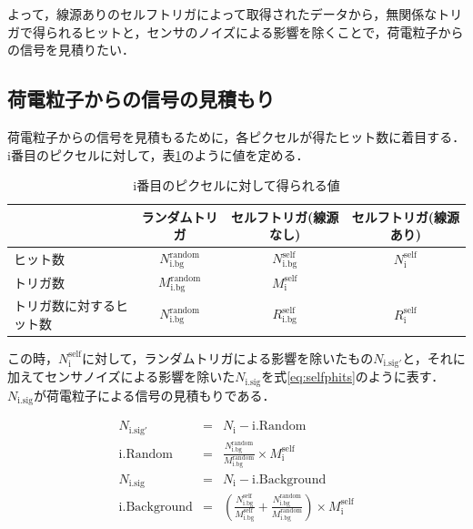 よって，線源ありのセルフトリガによって取得されたデータから，無関係なトリガで得られるヒットと，センサのノイズによる影響を除くことで，荷電粒子からの信号を見積りたい．

\subsection*{荷電粒子からの信号の見積もり}
荷電粒子からの信号を見積もるために，各ピクセルが得たヒット数に着目する．i番目のピクセルに対して，表\ref{tab:selfpara}のように値を定める．
  \begin{table}[h]
    \centering
    \caption{i番目のピクセルに対して得られる値}
    \begin{tabular} {l|ccc} \hline
      & ランダムトリガ & セルフトリガ(線源なし) & セルフトリガ(線源あり) \\ \hline
      ヒット数 & $N_{\mathrm{i.bg}}^{\mathrm{random}}$& $N_{\mathrm{i.bg}}^{\mathrm{self}}$ & $N_{\mathrm{i}}^{\mathrm{self}}$ \\
      トリガ数 & $M_{\mathrm{i.bg}}^{\mathrm{random}}$ & $M_{\mathrm{i}}^{\mathrm{self}}$ \\
      トリガ数に対するヒット数 & $N_{\mathrm{i.bg}}^{\mathrm{random}}$ & $R_{\mathrm{i.bg}}^{\mathrm{self}}$ & $R_{\mathrm{i}}^{\mathrm{self}}$ \\\hline
    \end{tabular}
    \label{tab:selfpara}
  \end{table}


この時，$N_{\mathrm{i}}^{\mathrm{self}}$に対して，ランダムトリガによる影響を除いたもの$N_{\mathrm{i.sig'}}$と，それに加えてセンサノイズによる影響を除いた$N_{\mathrm{i.sig}}$を式\ref{eq:selfphits}のように表す．$N_{\mathrm{i.sig}}$が荷電粒子による信号の見積もりである．
  
\begin{eqnarray}
  \label{eq:selfphits1}
  N_{\mathrm{i.sig'}} &=& N_{\mathrm{i}} - \mathrm{i.Random} \\
  \mathrm{i.Random} &=& \frac{N_{\mathrm{i.bg}}^{\mathrm{random}}}{M_{\mathrm{i.bg}}^{\mathrm{random}}} \times M_{\mathrm{i}}^{\mathrm{self}}\\
  N_{\mathrm{i.sig}} &=& N_{\mathrm{i}} - \mathrm{i.Background} \\
  \mathrm{i.Background} &=& \left(\frac{N_{\mathrm{i.bg}}^{\mathrm{self}}}{M_{\mathrm{i.bg}}^{\mathrm{self}}} + \frac{N_{\mathrm{i.bg}}^{\mathrm{random}}}{M_{\mathrm{i.bg}}^{\mathrm{random}}} \right) \times M_{\mathrm{i}}^{\mathrm{self}}
\end{eqnarray}

